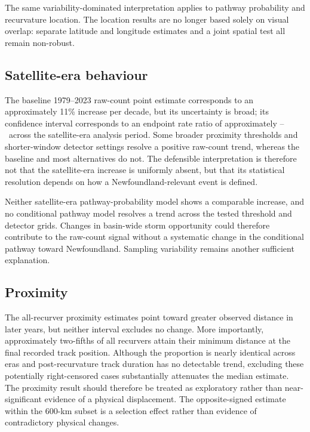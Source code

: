 \documentclass[11pt]{article}
\begin{document}
The same variability-dominated interpretation applies to pathway probability and recurvature location. The location results are no longer based solely on visual overlap: separate latitude and longitude estimates and a joint spatial test all remain non-robust.

\subsection{Satellite-era behaviour}
The baseline 1979--2023 raw-count point estimate corresponds to an approximately 11\% increase per decade, but its uncertainty is broad; its confidence interval corresponds to an endpoint rate ratio of approximately \SatelliteRecordFactorLow--\SatelliteRecordFactorHigh\ across the satellite-era analysis period. Some broader proximity thresholds and shorter-window detector settings resolve a positive raw-count trend, whereas the baseline and most alternatives do not. The defensible interpretation is therefore not that the satellite-era increase is uniformly absent, but that its statistical resolution depends on how a Newfoundland-relevant event is defined.

Neither satellite-era pathway-probability model shows a comparable increase, and no conditional pathway model resolves a trend across the tested threshold and detector grids. Changes in basin-wide storm opportunity could therefore contribute to the raw-count signal without a systematic change in the conditional pathway toward Newfoundland. Sampling variability remains another sufficient explanation.

\subsection{Proximity}
The all-recurver proximity estimates point toward greater observed distance in later years, but neither interval excludes no change. More importantly, approximately two-fifths of all recurvers attain their minimum distance at the final recorded track position. Although the proportion is nearly identical across eras and post-recurvature track duration has no detectable trend, excluding these potentially right-censored cases substantially attenuates the median estimate. The proximity result should therefore be treated as exploratory rather than near-significant evidence of a physical displacement. The opposite-signed estimate within the 600-km subset is a selection effect rather than evidence of contradictory physical changes.
\end{document}
